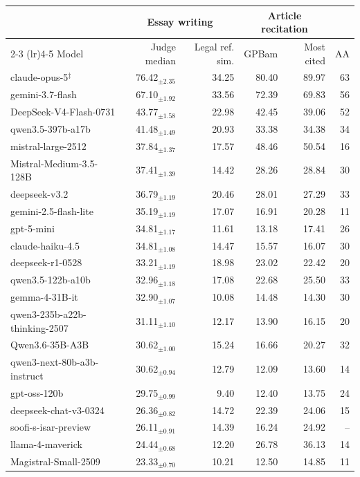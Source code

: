 \begin{tabular}{lrrrrr}
\toprule
 & \multicolumn{2}{c}{Essay writing} & \multicolumn{2}{c}{Article recitation} & \\
\cmidrule(lr){2-3} \cmidrule(lr){4-5}
Model & Judge median & Legal ref. sim. & GPBam & Most cited & AA \\
\midrule
claude-opus-5$^{\ddagger}$ & 76.42$_{\pm2.35}$ & 34.25 & 80.40 & 89.97 & 63 \\
gemini-3.7-flash & 67.10$_{\pm1.92}$ & 33.56 & 72.39 & 69.83 & 56 \\
DeepSeek-V4-Flash-0731 & 43.77$_{\pm1.58}$ & 22.98 & 42.45 & 39.06 & 52 \\
qwen3.5-397b-a17b & 41.48$_{\pm1.49}$ & 20.93 & 33.38 & 34.38 & 34 \\
mistral-large-2512 & 37.84$_{\pm1.37}$ & 17.57 & 48.46 & 50.54 & 16 \\
Mistral-Medium-3.5-128B & 37.41$_{\pm1.39}$ & 14.42 & 28.26 & 28.84 & 30 \\
deepseek-v3.2 & 36.79$_{\pm1.19}$ & 20.46 & 28.01 & 27.29 & 33 \\
gemini-2.5-flash-lite & 35.19$_{\pm1.19}$ & 17.07 & 16.91 & 20.28 & 11 \\
gpt-5-mini & 34.81$_{\pm1.17}$ & 11.61 & 13.18 & 17.41 & 26 \\
claude-haiku-4.5 & 34.81$_{\pm1.08}$ & 14.47 & 15.57 & 16.07 & 30 \\
deepseek-r1-0528 & 33.21$_{\pm1.19}$ & 18.98 & 23.02 & 22.42 & 20 \\
qwen3.5-122b-a10b & 32.96$_{\pm1.18}$ & 17.08 & 22.68 & 25.50 & 33 \\
gemma-4-31B-it & 32.90$_{\pm1.07}$ & 10.08 & 14.48 & 14.30 & 30 \\
qwen3-235b-a22b-thinking-2507 & 31.11$_{\pm1.10}$ & 12.17 & 13.90 & 16.15 & 20 \\
Qwen3.6-35B-A3B & 30.62$_{\pm1.00}$ & 15.24 & 16.66 & 20.27 & 32 \\
qwen3-next-80b-a3b-instruct & 30.62$_{\pm0.94}$ & 12.79 & 12.09 & 13.60 & 14 \\
gpt-oss-120b & 29.75$_{\pm0.99}$ & 9.40 & 12.40 & 13.75 & 24 \\
deepseek-chat-v3-0324 & 26.36$_{\pm0.82}$ & 14.72 & 22.39 & 24.06 & 15 \\
soofi-s-isar-preview & 26.11$_{\pm0.91}$ & 14.39 & 16.24 & 24.92 & -- \\
llama-4-maverick & 24.44$_{\pm0.68}$ & 12.20 & 26.78 & 36.13 & 14 \\
Magistral-Small-2509 & 23.33$_{\pm0.70}$ & 10.21 & 12.50 & 14.85 & 11 \\

\end{tabular}
